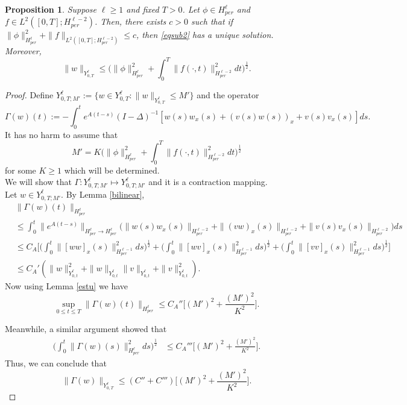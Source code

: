 \documentclass[10pt,a4paper,final]{article}
\numberwithin{equation}{section}
\newtheorem{prop}[theorem]{Proposition}
\begin{document}
\begin{prop} \label{estw}
 Suppose $\ell\geq 1$ and fixed $T>0
 $. Let $\phi\in H^{\ell}_{per}$ and $f\in L^2([0,T];H^{\ell-2}_{per})$. Then, there exists $c>0$ such that if $\|\phi\|_{H^{\ell}_{per}}^2+\|f\|_{L^2([0,T];H^{\ell-2}_{per})}\leq c$, then \eqref{eqsub2} has a unique solution. Moreover, 
 $$\|w\|_{Y^{\ell}_{0,T}}\leq \bigg(\|\phi\|_{H^{\ell}_{per}}^2+\int_0^T\|f(\cdot,t)\|_{H^{\ell-2}_{per}}^2dt\bigg)^{\frac12}.$$
\end{prop}
\begin{proof}
Define $Y^{\ell}_{0,T;M'}:=\{w\in Y^{\ell}_{0,T}: \|w\|_{Y^{\ell}_{0,T}}\leq M'\}$ and the operator 
$$\Gamma(w)(t):=-\int_0^t e^{A(t-s)}(I-\Delta)^{-1}[w(s)w_x(s)+(v(s)w(s))_x+v(s)v_x(s)]ds. $$ It has no harm to assume that 
$$M'=K\bigg(\|\phi\|_{H^{\ell}_{per}}^2+\int_0^T\|f(\cdot,t)\|_{H^{\ell-2}_{per}}^2dt\bigg)^{\frac12}$$
for some $K\geq1$ which will be determined. \\

We will show that $\Gamma: Y^{\ell}_{0,T;M'}\mapsto Y^{\ell}_{0,T;M'}$ and it is a contraction mapping. \\

Let $w\in Y^{\ell}_{0,T;M'}$. By Lemma \ref{bilinear}, 
\begin{align*}
& \|\Gamma(w)(t)\|_{H^{\ell}_{per}}\\
&\leq \int_0^t\|e^{A(t-s)}\|_{H^{\ell}_{per}\to H^{\ell}_{per}}\bigg(\|w(s)w_x(s)\|_{H^{\ell-2}_{per}}+\|(vw)_x(s)\|_{H^{\ell-2}_{per}}+\|v(s)v_x(s)\|_{H^{\ell-2}_{per}}\bigg)ds\\
&\leq C_A\bigg[\bigg(\int_0^t\|[ww]_x(s)\|_{H^{\ell-1}_{per}}^2ds\bigg)^{\frac12}+\bigg(\int_0^t\|[wv]_x(s)\|_{H^{\ell-1}_{per}}^2ds\bigg)^{\frac12} +\bigg(\int_0^t\|[vv]_x(s)\|_{H^{\ell-1}_{per}}^2ds\bigg)^{\frac12}\bigg]\\
&\leq C_A'(\|w\|_{Y^{\ell}_{0,t}}^2+\|w\|_{Y^{\ell}_{0,t}}\|v\|_{Y^{\ell}_{0,t}}+\|v\|_{Y^{\ell}_{0,t}}^2).
\end{align*}
Now using Lemma \ref{estu} we have 
$$\sup_{0\leq t\leq T}\|\Gamma(w)(t)\|_{H^{\ell}_{per}}\leq C_A''\bigg[(M')^2+\frac{(M')^2}{K^2}\bigg].$$

Meanwhile, a similar argument showed that 
\begin{align*}
    \bigg(\int_0^t \|\Gamma(w)(s)\|_{H^{\ell}_{per}}^2ds\bigg)^{\frac12} &\leq C_A'''\bigg[(M')^2+\frac{(M')^2}{K^2}\bigg].
\end{align*}
Thus, we can conclude that 
$$\|\Gamma(w)\|_{Y^{\ell}_{0,T}}\leq (C''+C''')\bigg[(M')^2+\frac{(M')^2}{K^2}\bigg].$$


\end{proof}
\end{document}
